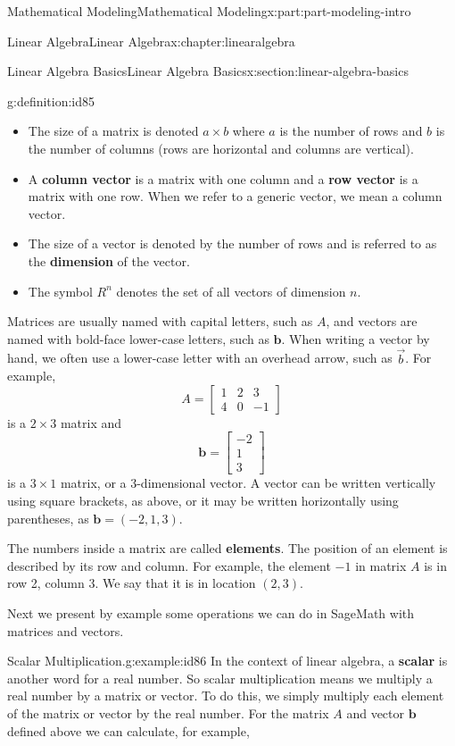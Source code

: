 \documentclass[oneside,10pt,]{book}
\newcommand{\terminology}[1]{\textbf{#1}}
\numberwithin{equation}{section}
\begin{document}
\begin{partptx}{Mathematical Modeling}{}{Mathematical Modeling}{}{}{x:part:part-modeling-intro}
\begin{chapterptx}{Linear Algebra}{}{Linear Algebra}{}{}{x:chapter:linearalgebra}
\begin{sectionptx}{Linear Algebra Basics}{}{Linear Algebra Basics}{}{}{x:section:linear-algebra-basics}
\begin{definition}{}{g:definition:id85}
\begin{itemize}[label=\textbullet]
\item{}The size of a matrix is denoted \(a\times b\) where \(a\) is the number of rows and \(b\) is the number of columns (rows are horizontal and columns are vertical).%
\item{}A \terminology{column vector} is a matrix with one column and a \terminology{row vector} is a matrix with one row. When we refer to a generic vector, we mean a column vector.%
\item{}The size of a vector is denoted by the number of rows and is referred to as the \terminology{dimension} of the vector.%
\item{}The symbol \(R^n\) denotes the set of all vectors of dimension \(n\).%
\end{itemize}
\end{definition}
Matrices are usually named with capital letters, such as \(A\), and vectors are named with bold-face lower-case letters, such as \(\mathbf{b}\). When writing a vector by hand, we often use a lower-case letter with an overhead arrow, such as \(\vec{b}\). For example,%
%
\begin{equation*}
A = \begin{bmatrix}
1 & 2 & 3 \\
4 & 0 & -1
\end{bmatrix}
\end{equation*}
is a \(2\times 3\) matrix and%
%
\begin{equation*}
\mathbf{b} = \begin{bmatrix}
-2 \\
1 \\
3
\end{bmatrix}
\end{equation*}
is a \(3\times 1\) matrix, or a 3-dimensional vector. A vector can be written vertically using square brackets, as above, or it may be written horizontally using parentheses, as \(\mathbf{b} = (-2,1,3)\).%
\par
The numbers inside a matrix are called \terminology{elements}. The position of an element is described by its row and column. For example, the element \(-1\) in matrix \(A\) is in row 2, column 3. We say that it is in location \((2, 3)\).%
\par
Next we present by example some operations we can do in SageMath with matrices and vectors.%
\begin{example}{Scalar Multiplication.}{g:example:id86}%
In the context of linear algebra, a \terminology{scalar} is another word for a real number. So scalar multiplication means we multiply a real number by a matrix or vector. To do this, we simply multiply each element of the matrix or vector by the real number. For the matrix \(A\) and vector \(\mathbf{b}\) defined above we can calculate, for example,%

\end{example}
\end{sectionptx}
\end{chapterptx}
\end{partptx}
\end{document}
